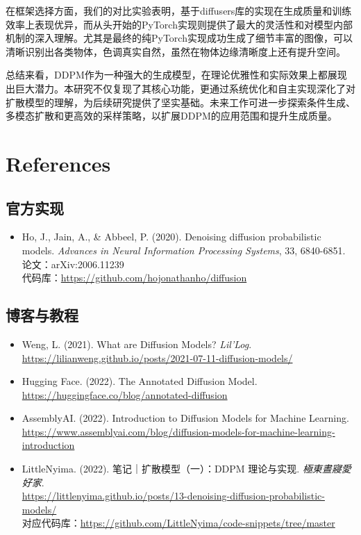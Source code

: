 \documentclass{ctexart}
\begin{document}
在框架选择方面，我们的对比实验表明，基于diffusers库的实现在生成质量和训练效率上表现优异，而从头开始的PyTorch实现则提供了最大的灵活性和对模型内部机制的深入理解。尤其是最终的纯PyTorch实现成功生成了细节丰富的图像，可以清晰识别出各类物体，色调真实自然，虽然在物体边缘清晰度上还有提升空间。

总结来看，DDPM作为一种强大的生成模型，在理论优雅性和实际效果上都展现出巨大潜力。本研究不仅复现了其核心功能，更通过系统优化和自主实现深化了对扩散模型的理解，为后续研究提供了坚实基础。未来工作可进一步探索条件生成、多模态扩散和更高效的采样策略，以扩展DDPM的应用范围和提升生成质量。

\section{References}

\subsection{官方实现}
\begin{itemize}
    \item Ho, J., Jain, A., \& Abbeel, P. (2020). Denoising diffusion probabilistic models. \textit{Advances in Neural Information Processing Systems}, 33, 6840-6851.\\
    论文：arXiv:2006.11239 \\
    代码库：\url{https://github.com/hojonathanho/diffusion}
\end{itemize}

\subsection{博客与教程}
\begin{itemize}
    \item Weng, L. (2021). What are Diffusion Models? \textit{Lil'Log}. \\
    \url{https://lilianweng.github.io/posts/2021-07-11-diffusion-models/}
    
    \item Hugging Face. (2022). The Annotated Diffusion Model. \\
    \url{https://huggingface.co/blog/annotated-diffusion}
    
    \item AssemblyAI. (2022). Introduction to Diffusion Models for Machine Learning. \\
    \url{https://www.assemblyai.com/blog/diffusion-models-for-machine-learning-introduction}
    
    \item LittleNyima. (2022). 笔记｜扩散模型（一）：DDPM 理论与实现. \textit{極東晝寢愛好家}. \\
    \url{https://littlenyima.github.io/posts/13-denoising-diffusion-probabilistic-models/} \\
    对应代码库：\url{https://github.com/LittleNyima/code-snippets/tree/master}
\end{itemize}
\end{document}
